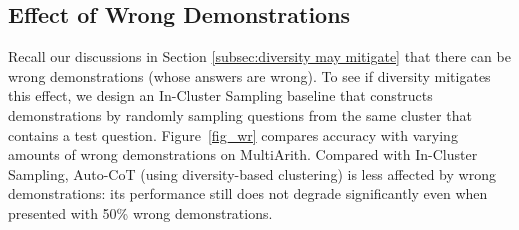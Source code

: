 \subsection{Effect of Wrong Demonstrations}\label{analysis:incorrect}

Recall our discussions in Section \ref{subsec:diversity may mitigate} that there can be wrong demonstrations (whose answers are wrong).
To see if diversity mitigates this effect, we design an In-Cluster Sampling baseline
that constructs demonstrations by randomly sampling questions from the same cluster that contains a test question.
Figure~\ref{fig_wr} compares accuracy with varying amounts of wrong demonstrations on MultiArith. 
Compared with In-Cluster Sampling, Auto-CoT (using diversity-based clustering) is less affected by wrong demonstrations: its performance still does not degrade significantly even when presented with 50\% wrong demonstrations. 
 
